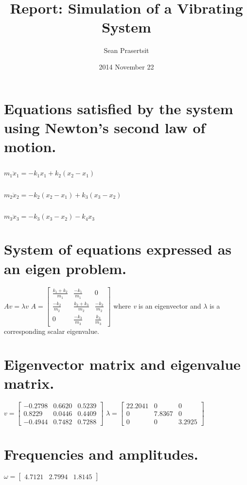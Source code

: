 \documentclass{article}
\begin{document}
\title{Report: Simulation of a Vibrating System}
\author{Sean Prasertsit}
\date{2014 November 22}
\maketitle

\section{Equations satisfied by the system using Newton's second law of motion.}
\subsection{}	\(m_1\ddot{x}_1 = -k_1x_1 + k_2(x_2 - x_1)\)
\subsection{}	\(m_2\ddot{x}_2 = -k_2(x_2 - x_1) + k_3(x_3 - x_2)\)
\subsection{}	\(m_3\ddot{x}_3 = -k_3(x_3 - x_2) - k_4x_3\)

\section{System of equations expressed as an eigen problem.}
\(Av = \lambda v\) \newline \newline
\(A = 
	\begin{bmatrix}
	\frac{k_1 + k_2}{m_1} 	& \frac{-k_1}{m_1} 		& 0 \\
	\frac{-k_2}{m_2} 		& \frac{k_2 + k_3}{m_2} & \frac{-k_2}{m_2} \\
	0						& \frac{-k_3}{m_3}		& \frac{k_3}{m_3}
	\end{bmatrix} \)
where \textit{v} is an eigenvector and \(\lambda \) is a corresponding scalar eigenvalue.

\section{Eigenvector matrix and eigenvalue matrix.}
\(v = 
	\begin{bmatrix}
	-0.2798	&	0.6620	&	0.5239 \\
	 0.8229	&	0.0446	&	0.4409 \\
	-0.4944	&	0.7482	&	0.7288
	\end{bmatrix} \)
\(\lambda =
	\begin{bmatrix}
	22.2041	&	0		&	0 \\
	0		&	7.8367	&	0 \\
	0		&	0		&	3.2925
	\end{bmatrix} \)

\section{Frequencies and amplitudes.}
\(\omega = 
	\begin{bmatrix}
	4.7121	&	2.7994	&	1.8145
	\end{bmatrix} \)
\end{document}
